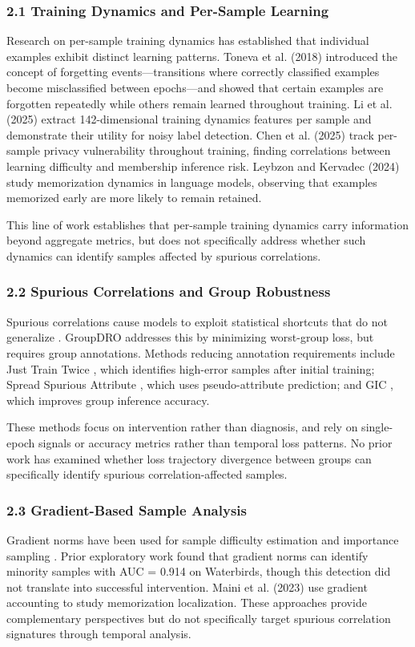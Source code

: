 
\subsubsection{2.1 Training Dynamics and Per-Sample Learning}

Research on per-sample training dynamics has established that individual examples exhibit distinct learning patterns. Toneva et al. (2018) introduced the concept of forgetting events---transitions where correctly classified examples become misclassified between epochs---and showed that certain examples are forgotten repeatedly while others remain learned throughout training. Li et al. (2025) extract 142-dimensional training dynamics features per sample and demonstrate their utility for noisy label detection. Chen et al. (2025) track per-sample privacy vulnerability throughout training, finding correlations between learning difficulty and membership inference risk. Leybzon and Kervadec (2024) study memorization dynamics in language models, observing that examples memorized early are more likely to remain retained.

This line of work establishes that per-sample training dynamics carry information beyond aggregate metrics, but does not specifically address whether such dynamics can identify samples affected by spurious correlations.

\subsubsection{2.2 Spurious Correlations and Group Robustness}

Spurious correlations cause models to exploit statistical shortcuts that do not generalize \citep{Geirhos2020Shortcut}. GroupDRO \citep{Sagawa2020Distributionally} addresses this by minimizing worst-group loss, but requires group annotations. Methods reducing annotation requirements include Just Train Twice \citep{Liu2021Just}, which identifies high-error samples after initial training; Spread Spurious Attribute \citep{Nam2022Spread}, which uses pseudo-attribute prediction; and GIC \citep{Han2024Improving}, which improves group inference accuracy.

These methods focus on intervention rather than diagnosis, and rely on single-epoch signals or accuracy metrics rather than temporal loss patterns. No prior work has examined whether loss trajectory divergence between groups can specifically identify spurious correlation-affected samples.

\subsubsection{2.3 Gradient-Based Sample Analysis}

Gradient norms have been used for sample difficulty estimation \citep{Katharopoulos2018Not} and importance sampling \citep{Johnson2018Training}. Prior exploratory work found that gradient norms can identify minority samples with AUC = 0.914 on Waterbirds, though this detection did not translate into successful intervention. Maini et al. (2023) use gradient accounting to study memorization localization. These approaches provide complementary perspectives but do not specifically target spurious correlation signatures through temporal analysis.
